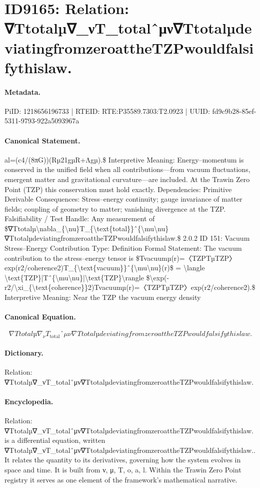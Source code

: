 \section*{ID9165: Relation: ∇Ttotalµ∇\_νT\_totalˆμν∇TtotalµdeviatingfromzeroattheTZPwouldfalsifythislaw.}
\paragraph{Metadata.}
PiID: 1218656196733 | RTEID: RTE:P35589.7303:T2.0923 | UUID: fd9c9b28-85ef-5311-9793-922a5093967a

\paragraph{Canonical Statement.}
al=(c4/(8πG))(Rµ21gµR+Λgµ).\$ Interpretive Meaning: Energy–momentum is conserved in the unified field when all contributions—from vacuum fluctuations, emergent matter and gravitational curvature—are included. At the Trawin Zero Point (TZP) this conservation must hold exactly. Dependencies: Primitive Derivable Consequences: Stress–energy continuity; gauge invariance of matter fields; coupling of geometry to matter; vanishing divergence at the TZP. Falsifiability / Test Handle: Any measurement of \$∇Ttotalµ\textbackslash{}nabla\_\{\textbackslash{}nu\}T\_\{\textbackslash{}text\{total\}\}ˆ\{\textbackslash{}mu\textbackslash{}nu\}∇TtotalµdeviatingfromzeroattheTZPwouldfalsifythislaw.\$ 2.0.2 ID 151: Vacuum Stress–Energy Contribution Type: Definition Formal Statement: The vacuum contribution to the stress–energy tensor is \$Tvacuumµ(r)=〈TZPTµTZP〉exp(r2/coherence2)T\_\{\textbackslash{}text\{vacuum\}\}ˆ\{\textbackslash{}mu\textbackslash{}nu\}(r)\$ = \textbackslash{}langle \textbackslash{}text\{TZP\}|Tˆ\{\textbackslash{}mu\textbackslash{}nu\}|\textbackslash{}text\{TZP\}\textbackslash{}rangle \$\textbackslash{}exp(-r2/\textbackslash{}xi\_\{\textbackslash{}text\{coherence\}\}2)Tvacuumµ(r)=〈TZPTµTZP〉exp(r2/coherence2).\$ Interpretive Meaning: Near the TZP the vacuum energy density

\paragraph{Canonical Equation.}
\[
∇Ttotalµ\nabla_{\nu}T_{\text{total}}ˆ{\mu\nu}∇TtotalµdeviatingfromzeroattheTZPwouldfalsifythislaw.
\]

\paragraph{Dictionary.}
Relation: ∇Ttotalµ∇\_νT\_totalˆμν∇TtotalµdeviatingfromzeroattheTZPwouldfalsifythislaw.

\paragraph{Encyclopedia.}
Relation: ∇Ttotalµ∇\_νT\_totalˆμν∇TtotalµdeviatingfromzeroattheTZPwouldfalsifythislaw. is a differential equation, written ∇Ttotalµ∇\_νT\_totalˆμν∇TtotalµdeviatingfromzeroattheTZPwouldfalsifythislaw.. It relates the quantity to its derivatives, governing how the system evolves in space and time. It is built from ν, μ, T, o, a, l. Within the Trawin Zero Point registry it serves as one element of the framework's mathematical narrative.
